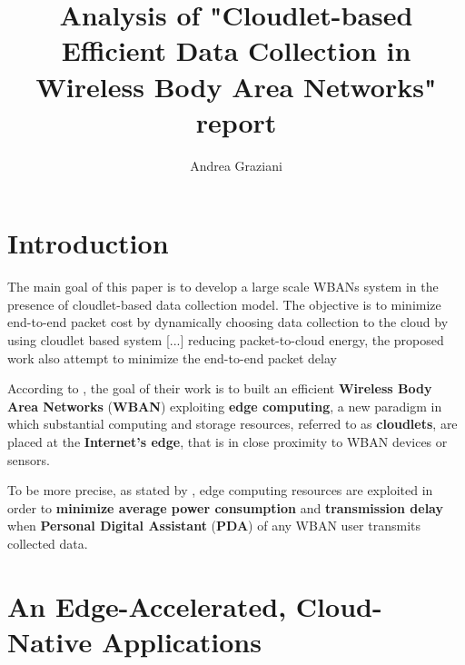 \documentclass[sigchi]{acmart}
\begin{document}
\title{Analysis of "Cloudlet-based Efficient Data Collection in Wireless Body Area Networks" report}

\author{Andrea Graziani}

\renewcommand{\shortauthors}{Andrea Graziani (0273395)}

\maketitle

\section{Introduction}

\vspace{0.3cm}

\begin{quoting}[font=itshape, begintext={``}, endtext={''\cite[par.~1.4]{MSAReport}}]
The main goal of this paper is to develop a large scale WBANs system in the presence of cloudlet-based data collection model. The objective is to minimize end-to-end packet cost by dynamically choosing data collection to the cloud by using cloudlet based system [...] reducing packet-to-cloud energy, the proposed work also attempt to minimize the end-to-end packet delay
\end{quoting}

\vspace{0.3cm}

According to \citet{MSAReport}, the goal of their work is to built an efficient \textbf{Wireless Body Area Networks} (\textbf{WBAN}) exploiting \textbf{edge computing}, a new paradigm in which substantial computing and storage resources, referred to as \textbf{cloudlets}, are placed at the \textbf{Internet's edge}, that is in close proximity to WBAN devices or sensors.\cite{TheEmergenceOfEdgeComputing}

To be more precise, as stated by \citet{MSAReport}, edge computing resources are exploited in order to \textbf{minimize average power consumption} and \textbf{transmission delay} when \textbf{Personal Digital Assistant} (\textbf{PDA}) of any WBAN user transmits collected data.

\section{An Edge-Accelerated, Cloud-Native Applications}
\end{document}
